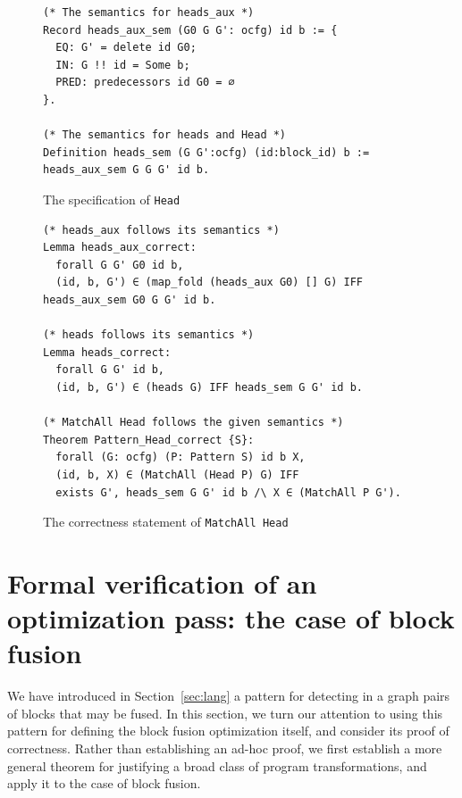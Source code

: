 \documentclass[11pt]{article}
\newcommand{\inlinecoq}[1]{\mbox{\lstinline[style=customcoq,columns=fixed,basewidth=.48em]{#1}}}
\newcommand{\ilc}[1]{\inlinecoq{#1}}
\newcommand{\yzt}[1]{\textcolor{ForestGreen!50}{#1}}
\newcommand{\cut}[1]{\textcolor{Gray!40}{#1}}
\begin{document}
\begin{figure}[h]
  \begin{lstlisting}[style=customcoq,basicstyle=\small\ttfamily]
(* The semantics for heads_aux *)
Record heads_aux_sem (G0 G G': ocfg) id b := {
  EQ: G' = delete id G0;
  IN: G !! id = Some b;
  PRED: predecessors id G0 = ∅
}.

(* The semantics for heads and Head *)
Definition heads_sem (G G':ocfg) (id:block_id) b := heads_aux_sem G G G' id b.
  \end{lstlisting}
  \caption{The specification of \ilc{Head}}
  \label{fig:sem_head_def}
  \vspace{1em}
  \begin{lstlisting}[style=customcoq,basicstyle=\small\ttfamily]
(* heads_aux follows its semantics *)
Lemma heads_aux_correct:
  forall G G' G0 id b,
  (id, b, G') ∈ (map_fold (heads_aux G0) [] G) IFF heads_aux_sem G0 G G' id b.

(* heads follows its semantics *)
Lemma heads_correct:
  forall G G' id b,
  (id, b, G') ∈ (heads G) IFF heads_sem G G' id b.

(* MatchAll Head follows the given semantics *)
Theorem Pattern_Head_correct {S}:
  forall (G: ocfg) (P: Pattern S) id b X,
  (id, b, X) ∈ (MatchAll (Head P) G) IFF
  exists G', heads_sem G G' id b /\ X ∈ (MatchAll P G').
  \end{lstlisting}
  \caption{The correctness statement of \ilc{MatchAll Head}}
  \label{fig:head_cor}
\end{figure}

\section{Formal verification of an optimization pass: the case of block fusion}
\label{sec:deno}

\yzt{We have introduced in Section~\ref{sec:lang} a pattern for detecting in a graph pairs of blocks that may be fused. In this section, we turn our attention to using this pattern for defining the block fusion optimization itself, and consider its proof of correctness. Rather than establishing an ad-hoc proof, we first establish a more general theorem for justifying a broad class of program transformations, and apply it to the case of block fusion.}
\end{document}

